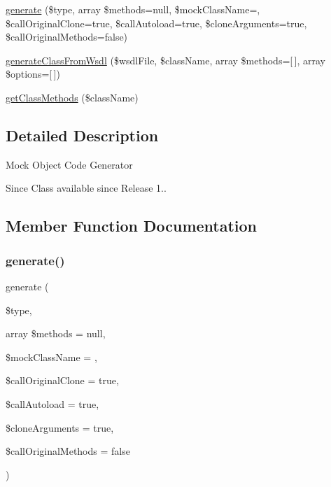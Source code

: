 \begin{DoxyCompactItemize}
\item 
\mbox{\hyperlink{class_p_h_p_unit___framework___mock_object___generator_ae878e56d3f3c00386b41c6788a113f69}{generate}} (\$type, array \$methods=null, \$mock\+Class\+Name=\textquotesingle{}\textquotesingle{}, \$call\+Original\+Clone=true, \$call\+Autoload=true, \$clone\+Arguments=true, \$call\+Original\+Methods=false)
\item 
\mbox{\hyperlink{class_p_h_p_unit___framework___mock_object___generator_ae6b3bdda520502ad2027bd5f3b1eecb3}{generate\+Class\+From\+Wsdl}} (\$wsdl\+File, \$class\+Name, array \$methods=\mbox{[}$\,$\mbox{]}, array \$options=\mbox{[}$\,$\mbox{]})
\item 
\mbox{\hyperlink{class_p_h_p_unit___framework___mock_object___generator_a6e2cfbf16be19a8ff5ea30a745a55bf7}{get\+Class\+Methods}} (\$class\+Name)
\end{DoxyCompactItemize}


\subsection{Detailed Description}
Mock Object Code Generator

\begin{DoxySince}{Since}
Class available since Release 1.. 
\end{DoxySince}


\subsection{Member Function Documentation}
\mbox{\label{class_p_h_p_unit___framework___mock_object___generator_ae878e56d3f3c00386b41c6788a113f69}} 
\subsubsection{\texorpdfstring{generate()}{generate()}}
{\footnotesize\ttfamily generate (\begin{DoxyParamCaption}\item[{}]{\$type,  }\item[{array}]{\$methods = {\ttfamily null},  }\item[{}]{\$mock\+Class\+Name = {\ttfamily \textquotesingle{}\textquotesingle{}},  }\item[{}]{\$call\+Original\+Clone = {\ttfamily true},  }\item[{}]{\$call\+Autoload = {\ttfamily true},  }\item[{}]{\$clone\+Arguments = {\ttfamily true},  }\item[{}]{\$call\+Original\+Methods = {\ttfamily false} }\end{DoxyParamCaption})}


